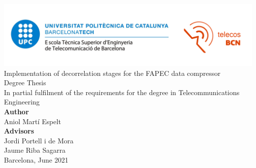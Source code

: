 \thispagestyle{empty}

\begin{center}
	\includegraphics[width=\textwidth]{images/logo.png}\\
	
	\vspace*{3cm}
	\Huge
	Implementation of decorrelation stages for the FAPEC data compressor\\
	
	\vspace*{3cm}
	\large
	Degree Thesis\\
	In partial fulfilment of the requirements for the degree in Telecommunications Engineering\\
	
	\vspace*{2cm}
	\textbf{Author}\\
	Aniol Martí Espelt\\
	\vspace*{1.5em}
	\textbf{Advisors}\\
	Jordi Portell i de Mora\\
	Jaume Riba Sagarra\\
	
	\vspace*{3cm}
	Barcelona, June 2021
	
\end{center}
